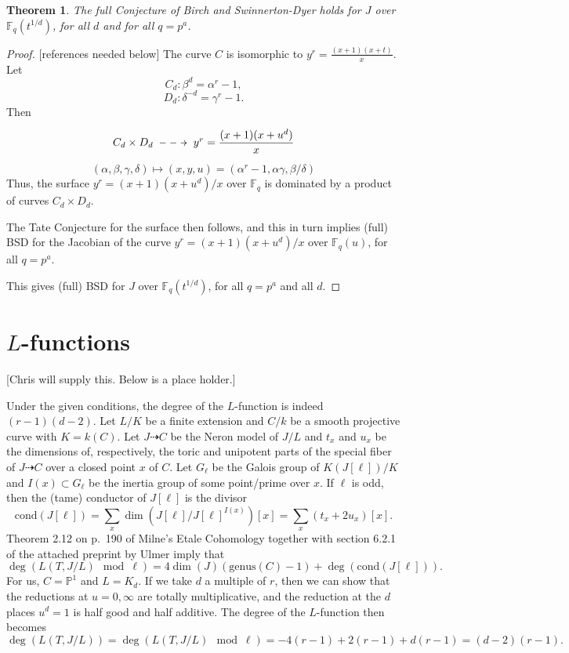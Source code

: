 \documentclass[reqno]{amsart}
\newtheorem{thm}{Theorem}[section]
\theoremstyle{definition}
\theoremstyle{remark}
\def\genus{\textrm{genus}}
\def\cond{\textrm{cond}}
\def\F{\mathbb{F}}
\def\P{\mathbb{P}}
\begin{document}
\begin{thm}
The full Conjecture of Birch and Swinnerton-Dyer holds for
$J$ over $\F_q(t^{1/d})$, for all $d$ and for all $q=p^a$. 
\end{thm}

\begin{proof}

[references needed below]
The curve $C$ is isomorphic to $y^r = \frac{(x+1)(x+t)}{x}$.
Let
$$
C_d : \beta^d = \alpha^r - 1,
$$
$$
D_d : \delta^{-d} = \gamma^r - 1.
$$
Then 
$$
\xymatrix{C_d \times D_d~ \ar@{-->}[r]& ~y^r = \displaystyle\frac{(x+1)(x+u^d)}{x}}
$$ 
$$
(\alpha,\beta,\gamma,\delta) \mapsto (x,y,u) = (\alpha^r-1, \alpha\gamma, \beta/\delta)
$$
Thus, the surface
$y^r =(x+1)(x+u^d)/x$ over $\F_q$ 
is dominated by a product of curves $C_d \times D_d$.

The Tate Conjecture for the surface then follows,
and this in turn implies (full) BSD for the
Jacobian of the curve $y^r =(x+1)(x+u^d)/x$ over $\F_q(u)$,
for all $q=p^a$.

This gives (full) BSD for $J$ over $\F_q(t^{1/d})$,
for all $q=p^a$ and all $d$.
\end{proof}

\section{$L$-functions}
[Chris will supply this. Below is a place holder.]

Under the given conditions, the degree of the $L$-function is indeed $(r-1)(d-2)$.
Let $L/K$ be a finite extension and $C/k$ be a smooth projective curve with $K=k(C)$.
Let $J\dashrightarrow C$ be the Neron model of $J/L$ and $t_x$ and $u_x$ be the dimensions of, respectively, the toric and unipotent parts of the special fiber of $J\dashrightarrow C$ over a closed point $x$ of $C$.  Let $G_\ell$ be the Galois group of $K(J[\ell])/K$ and $I(x)\subset G_\ell$ be the inertia group of some point/prime over $x$.  If $\ell$ is odd, then the (tame) conductor of $J[\ell]$ is the divisor
$$\cond(J[\ell]) = \sum_x \dim(J[\ell]/J[\ell]^{I(x)})[x] = \sum_x (t_x+2u_x)[x].$$
Theorem 2.12 on p.~190 of Milne's Etale Cohomology together with section 6.2.1 of the attached preprint by Ulmer imply that
$$\deg(L(T,J/L) \mod \ell) = 4\dim(J)(\genus(C)-1) + \deg(\cond(J[\ell])).$$
For us, $C=\P^1$ and $L=K_d$.
If we take $d$ a multiple of $r$, then we can show that 
the reductions at $u=0,\infty$ are totally multiplicative,
and the reduction at the $d$ places $u^d=1$ is half good and half additive.
The degree of the $L$-function then becomes
$$\deg(L(T,J/L))
=\deg(L(T,J/L) \mod \ell) =  -4(r-1) + 2(r-1) + d(r-1) = (d-2)(r-1).$$
\end{document}
